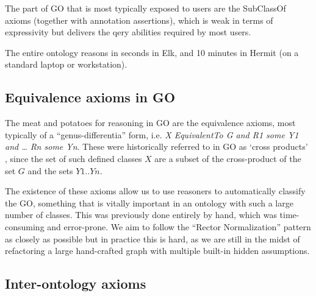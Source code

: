 \documentclass{llncs}
\begin{document}
The part of GO that is most typically exposed to users are the
SubClassOf axioms (together with annotation assertions), which is weak
in terms of expressivity but delivers the qery abilities required by
most users.

The entire ontology reasons in seconds in Elk\cite{kazakov2012elk}, and 10
minutes in Hermit (on a standard laptop or workstation).

\subsection{Equivalence axioms in GO}

The meat and potatoes for reasoning in GO are the equivalence axioms,
most typically of a ``genus-differentia'' form, i.e. \emph{X
  EquivalentTo G and R1 some Y1 and … Rn some Yn}. These were
historically referred to in GO as `cross
products' \cite{Mungall2010GOXP}, since the set of such defined classes
$X$ are a subset of the cross-product of the set $G$ and the sets
$Y1..Yn$.

The existence of these axioms allow us to use reasoners to
automatically classify the GO, something that is vitally important in
an ontology with such a large number of classes. This was previously
done entirely by hand, which was time-consuming and error-prone. We
aim to follow the ``Rector Normalization''
pattern\cite{rector_modularisation_2003} as closely as possible but in
practice this is hard, as we are still in the midst of refactoring a
large hand-crafted graph with multiple built-in hidden assumptions. 


\subsection{Inter-ontology axioms}
\end{document}
